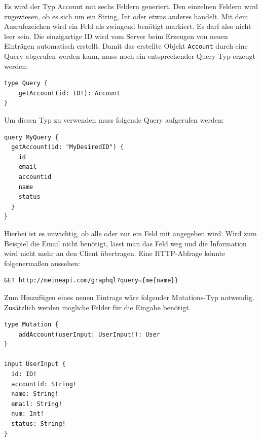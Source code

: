 Es wird der Typ Account mit sechs Feldern generiert.
Den einzelnen Feldern wird zugewiesen, ob es sich um ein String, Int oder etwas anderes handelt.
Mit dem Ausrufezeichen wird ein Feld als zwingend benötigt markiert.
Es darf also nicht leer sein. Die einzigartige ID wird vom Server beim Erzeugen von neuen Einträgen automatisch erstellt.
Damit das erstellte Objekt \verb+Account+ durch eine Query abgerufen werden kann, muss noch ein entsprechender Query-Typ erzeugt werden:

\begin{lstlisting}[basicstyle=\ttfamily, breaklines=true , frame = single, backgroundcolor=\color{lightgray} ]
type Query {
	getAccount(id: ID!): Account
}

\end{lstlisting}

Um diesen Typ zu verwenden muss folgende Query aufgerufen werden:

\begin{lstlisting}[basicstyle=\ttfamily, breaklines=true , frame = single, backgroundcolor=\color{lightgray} ]
  query MyQuery {
  getAccount(id: "MyDesiredID") {
    id
    email
    accountid
    name
    status
  }
}

\end{lstlisting}

Hierbei ist es unwichtig, ob alle oder nur ein Feld mit angegeben wird.
Wird zum Beispiel die Email nicht benötigt, lässt man das Feld weg und die Information wird nicht mehr an den Client übertragen.\cite[]{GraphQL1}
Eine HTTP-Abfrage könnte folgenermaßen aussehen\cite[]{GraphQLHTTP}:

\begin{lstlisting}[basicstyle=\ttfamily, breaklines=true , frame = single, backgroundcolor=\color{lightgray} ]
  GET http://meineapi.com/graphql?query={me{name}}

\end{lstlisting}


Zum Hinzufügen eines neuen Eintrags wäre folgender Mutations-Typ notwendig.
Zusätzlich werden mögliche Felder für die Eingabe benötigt.


\begin{lstlisting}[basicstyle=\ttfamily, breaklines=true , frame = single, backgroundcolor=\color{lightgray} ]
  type Mutation {
    addAccount(userInput: UserInput!): User
}

input UserInput {
  id: ID!
  accountid: String!
  name: String!
  email: String!
  num: Int!
  status: String!
}
\end{lstlisting}

